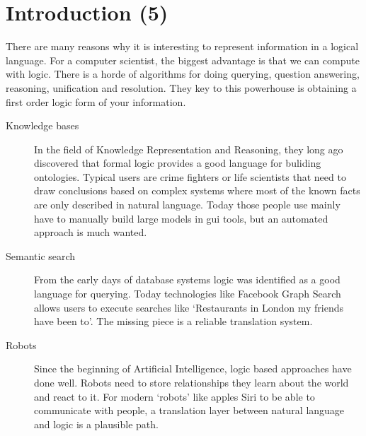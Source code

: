 \documentclass[12pt]{article}
\let\stdsection\section
\renewcommand\section{\newpage\stdsection}
\begin{document}
\tableofcontents


\section{Introduction (5)}



There are many reasons why it is interesting to represent information in a logical language. For a computer scientist, the biggest advantage is that we can compute with logic. There is a horde of algorithms for doing querying, question answering, reasoning, unification and resolution. They key to this powerhouse is obtaining a first order logic form of your information.

\begin{description}
\item[Knowledge bases] In the field of Knowledge Representation and Reasoning, they long ago discovered that formal logic provides a good language for buliding ontologies. Typical users are crime fighters or life scientists that need to draw conclusions based on complex systems\cite{malone2010modeling} where most of the known facts are only described in natural language. Today those people use mainly have to manually build large models in gui tools, but an automated approach is much wanted.

\item[Semantic search] From the early days of database systems logic was identified\cite{fagin1995reasoning} as a good language for querying. Today technologies like Facebook Graph Search allows users to execute searches like `Restaurants in London my friends have been to'. The missing piece is a reliable translation system.

\item[Robots] Since the beginning of Artificial Intelligence, logic based approaches have done well.\cite{russell2010artificial} Robots need to store relationships they learn about the world and react to it. For modern `robots' like apples Siri to be able to communicate with people, a translation layer between natural language and logic is a plausible path.
\end{description}
\end{document}
